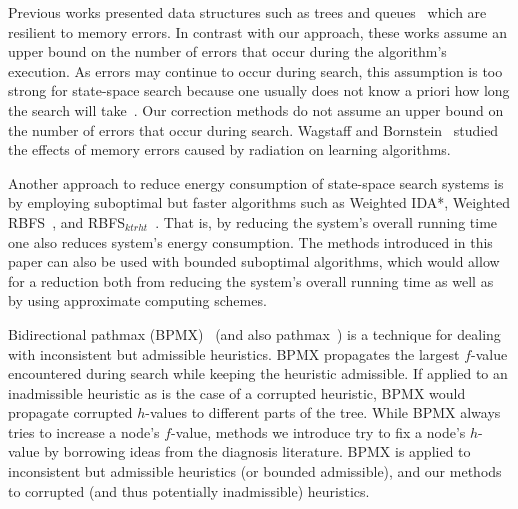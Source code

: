 \documentclass[letterpaper]{article}
\begin{document}
Previous works presented data structures such as trees \cite{finocchi2007resilient} and queues~\cite{jorgensen2007priority} which are resilient to memory errors.
In contrast with our approach, these works %
assume an upper bound on the number of errors that occur during the algorithm's execution. As errors may continue to occur during search, this assumption is too strong for state-space search because one usually does not know a priori how long the search will take~\cite{Knuth75}. Our correction methods do not assume an upper bound on the number of errors that occur during search. 
%
Wagstaff and Bornstein~ studied the effects of memory errors caused by radiation on learning algorithms. %

Another approach to reduce energy consumption of state-space search systems is by employing suboptimal but faster algorithms such as Weighted IDA*, Weighted RBFS~\cite{Korf1992}, and RBFS$_{ktrht}$~\cite{hatem2015recursive}. That is, by reducing the system's overall running time one also reduces system's energy consumption. %
The methods introduced in this paper can also be used with bounded suboptimal algorithms, which would allow for a reduction both from reducing the system's overall running time as well as by using approximate computing schemes. 

Bidirectional pathmax (BPMX)~\cite{FelnerZHSSZ11} (and also pathmax~\cite{mero1984aHeuristicSearch}) is a technique for dealing with inconsistent but admissible heuristics. BPMX propagates the largest $f$-value encountered during search while keeping the heuristic admissible. If applied to an inadmissible heuristic as is the case of a corrupted heuristic, BPMX would propagate corrupted $h$-values to different parts of the tree. While BPMX always tries to increase a node's $f$-value, methods we introduce try to fix a node's $h$-value by borrowing ideas from the diagnosis literature. BPMX is applied to inconsistent but admissible heuristics (or bounded admissible), and our methods to corrupted (and thus potentially inadmissible) heuristics. 
\end{document}
